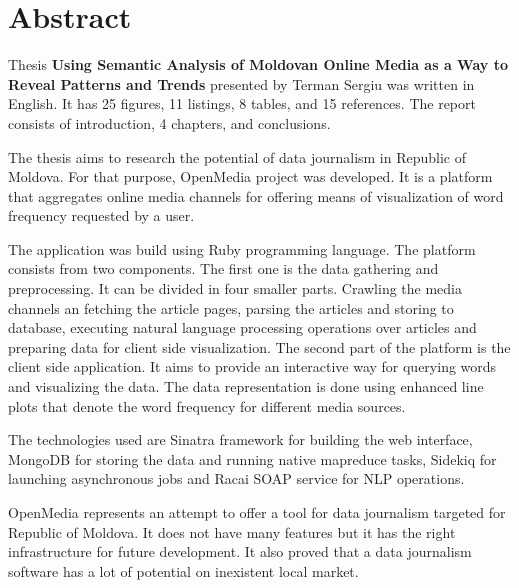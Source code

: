 \section*{Abstract}
Thesis \textbf{Using Semantic Analysis of Moldovan Online Media as a Way to Reveal Patterns and Trends} presented by Terman Sergiu was written in English. It has 25 figures, 11 listings, 8 tables, and 15 references. The report consists of introduction, 4 chapters, and conclusions.

The thesis aims to research the potential of data journalism in Republic of Moldova. For that purpose, OpenMedia project was developed. It is a platform that aggregates online media channels for offering means of visualization of word frequency requested by a user.

The application was build using Ruby programming language. The platform consists from two components. The first one is the data gathering and preprocessing. It can be divided in four smaller parts. Crawling the media channels an fetching the article pages, parsing the articles and storing to database, executing natural language processing operations over articles and preparing data for client side visualization. The second part of the platform is the client side application. It aims to provide an interactive way for querying words and visualizing the data. The data representation is done using enhanced line plots that denote the word frequency for different media sources.

The technologies used are Sinatra framework for building the web interface, MongoDB for storing the data and running native mapreduce tasks, Sidekiq for launching asynchronous jobs and Racai SOAP service for NLP operations.

OpenMedia represents an attempt to offer a tool for data journalism targeted for Republic of Moldova. It does not have many features but it has the right infrastructure for future development. It also proved that a data journalism software has a lot of potential on inexistent local market.